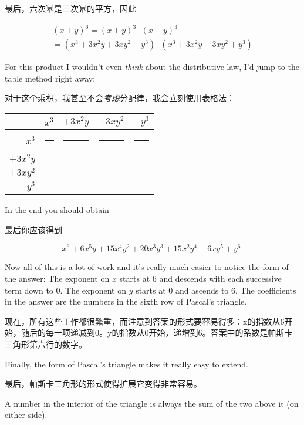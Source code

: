 最后，六次幂是三次幂的平方，因此

\begin{gather*} 
(x+y)^6 = (x+y)^3 \cdot (x+y)^3 \\
= (x^3 + 3x^2y + 3xy^2 + y^3) \cdot (x^3 + 3x^2y + 3xy^2 + y^3)
\end{gather*}

For this product I wouldn't even \emph{think} about the distributive
law, I'd jump to the table method right away:

对于这个乘积，我甚至不会\emph{考虑}分配律，我会立刻使用表格法：

\begin{center}
\begin{tabular}{r|cccc}
\rule[-6pt]{0pt}{24pt} & $x^3$ & $+ 3x^2y$ & $+ 3xy^2$ & $+ y^3$ \\ \hline
\rule[-6pt]{0pt}{24pt} $x^3$ & \rule{45pt}{0pt} & \rule{45pt}{0pt} & \rule{45pt}{0pt} & \rule{45pt}{0pt} \\
\rule[-6pt]{0pt}{24pt} $+ 3x^2y$ &       &           &           &         \\
\rule[-6pt]{0pt}{24pt} $+ 3xy^2$ &       &           &           &         \\
\rule[-6pt]{0pt}{24pt} $+ y^3$   &       &           &           &         \\

\end{tabular} 
\end{center}

In the end you should obtain 

最后你应该得到

\[ x^6 + 6 x^5y + 15 x^4y^2 + 20 x^3y^3 + 15 x^2y^4 + 6 xy^5 + y^6. \]

Now all of this is a lot of work and it's really much easier
to notice the form of the answer:  The exponent on $x$ starts at 6 and descends
with each successive term down to 0.  The exponent on $y$ starts at 0
and ascends to 6.  The coefficients in the answer are the numbers in the 
sixth row of Pascal's triangle.

现在，所有这些工作都很繁重，而注意到答案的形式要容易得多：x的指数从6开始，随后的每一项递减到0。y的指数从0开始，递增到6。答案中的系数是帕斯卡三角形第六行的数字。

Finally, the form of Pascal's triangle makes it really easy to extend.

最后，帕斯卡三角形的形式使得扩展它变得非常容易。

A number in the interior of the triangle is always the sum of the two
above it (on either side).

